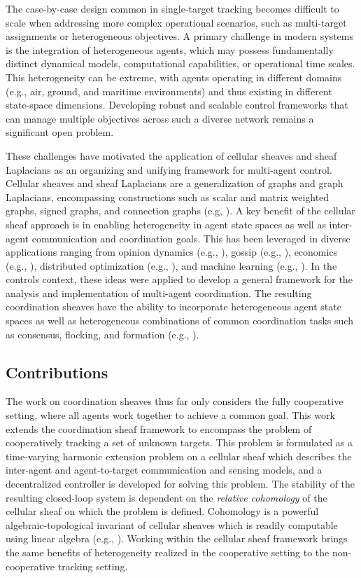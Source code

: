 \documentclass[letterpaper, 10 pt, conference]{ieeeconf}
\theoremstyle{definition}
\begin{document}
The case-by-case design common in single-target tracking becomes difficult to scale when addressing more complex operational scenarios, such as multi-target assignments or heterogeneous objectives. A primary challenge in modern systems is the integration of heterogeneous agents, which may possess fundamentally distinct dynamical models, computational capabilities, or operational time scales. This heterogeneity can be extreme, with agents operating in different domains (e.g., air, ground, and maritime environments) and thus existing in different state-space dimensions. Developing robust and scalable control frameworks that can manage multiple objectives across such a diverse network remains a significant open problem.

These challenges have motivated the application of cellular sheaves and sheaf Laplacians as an organizing and unifying framework for multi-agent control. Cellular sheaves and sheaf Laplacians are a generalization of graphs and graph Laplacians, encompassing constructions such as scalar and matrix weighted graphs, signed graphs, and connection graphs (e.g, \cite{Hansen.Jakob2020a}). A key benefit of the cellular sheaf approach is in enabling heterogeneity in agent state spaces as well as inter-agent communication and coordination goals. This has been leveraged in diverse applications ranging from opinion dynamics (e.g., \cite{Hansen.Jakob2021}), gossip (e.g., \cite{Riess.Hans2022}), economics (e.g., \cite{Riess.Hans2023}), distributed optimization (e.g., \cite{Hansen.Jakob2019b}), and machine learning (e.g., \cite{Hansen.Jakob2020b, Bodnar.Cristian2022}). In the controls context, these ideas were applied to develop a general framework for the analysis and implementation of multi-agent coordination. The resulting coordination sheaves have the ability to incorporate heterogeneous agent state spaces as well as heterogeneous combinations of common coordination tasks such as consensus, flocking, and formation (e.g., \cite{Hanks.Tyler2025,Zhao.Yichen2025}).

\subsection*{Contributions}
The work on coordination sheaves thus far only considers the fully cooperative setting, where all agents work together to achieve a common goal. This work extends the coordination sheaf framework to encompass the problem of cooperatively tracking a set of unknown targets. This problem is formulated as a time-varying harmonic extension problem on a cellular sheaf which describes the inter-agent and agent-to-target communication and sensing models, and a decentralized controller is developed for solving this problem. The stability of the resulting closed-loop system is dependent on the \emph{relative cohomology} of the cellular sheaf on which the problem is defined. Cohomology is a powerful algebraic-topological invariant of cellular sheaves which is readily computable using linear algebra (e.g., \cite{Hansen.Jakob2019a}). Working within the cellular sheaf framework brings the same benefits of heterogeneity realized in the cooperative setting to the non-cooperative tracking setting. 
\end{document}
